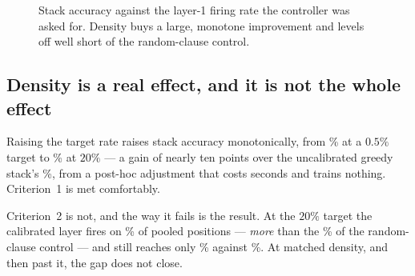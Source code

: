 \begin{figure}[h]
\centering
{}
\caption{Stack accuracy against the layer-1 firing rate the controller was asked for. Density
buys a large, monotone improvement and levels off well short of the random-clause control.}
\label{fig:calib}
\end{figure}

\subsection{Density is a real effect, and it is not the whole effect}

\begin{ttkey}
Raising the target rate raises stack accuracy monotonically, from
\accMctmCalibRZeroZeroFive{}\% at a $0.5\%$ target to \accMctmCalibRTwoZero{}\% at $20\%$ ---
a gain of nearly ten points over the uncalibrated greedy stack's \accMctm{}\%, from a
post-hoc adjustment that costs seconds and trains nothing. Criterion~1 is met comfortably.

Criterion~2 is not, and the way it fails is the result. At the $20\%$ target the calibrated
layer fires on \calibFireMctmCalibRTwoZero{}\% of pooled positions --- \emph{more} than the
\fireRandomPre{}\% of the random-clause control --- and still reaches only
\accMctmCalibRTwoZero{}\% against \accMctmRandom{}\%. At matched density, and then past it,
the gap does not close.
\end{ttkey}

